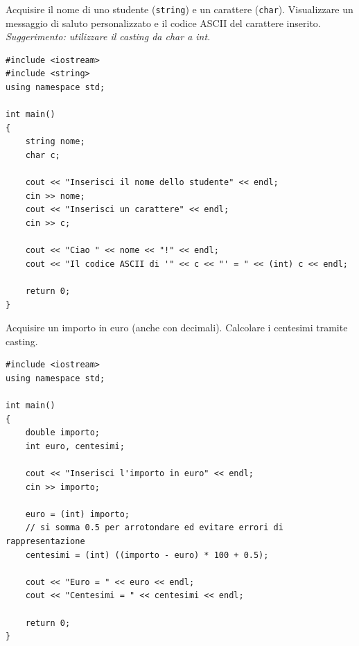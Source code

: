 \documentclass[11pt,fleqn]{book}
\begin{document}
\begin{esercizio}[1]
    Acquisire il nome di uno studente (\texttt{string}) e un carattere (\texttt{char}). Visualizzare un messaggio di saluto personalizzato e il codice ASCII del carattere inserito.\\
    \textit{Suggerimento: utilizzare il casting da char a int.}
    \ifsoluzioni
    \solution
    \begin{lstlisting}[style=cpp]
#include <iostream>
#include <string>
using namespace std;

int main()
{
    string nome;
    char c;

    cout << "Inserisci il nome dello studente" << endl;
    cin >> nome;
    cout << "Inserisci un carattere" << endl;
    cin >> c;

    cout << "Ciao " << nome << "!" << endl;
    cout << "Il codice ASCII di '" << c << "' = " << (int) c << endl;

    return 0;
}
    \end{lstlisting}
    \fi
\end{esercizio}

\begin{esercizio}[1]
    Acquisire un importo in euro (anche con decimali). Calcolare i centesimi tramite casting.
    \ifsoluzioni
    \solution
    \begin{lstlisting}[style=cpp]
#include <iostream>
using namespace std;

int main()
{
    double importo;
    int euro, centesimi;

    cout << "Inserisci l'importo in euro" << endl;
    cin >> importo;

    euro = (int) importo;
    // si somma 0.5 per arrotondare ed evitare errori di rappresentazione
    centesimi = (int) ((importo - euro) * 100 + 0.5);

    cout << "Euro = " << euro << endl;
    cout << "Centesimi = " << centesimi << endl;

    return 0;
}
    \end{lstlisting}
    \fi
\end{esercizio}
\end{document}
